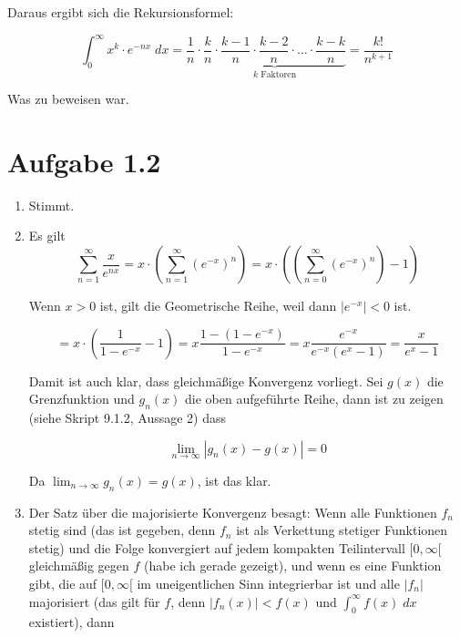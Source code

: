 \documentclass[a4paper,german,12pt,smallheadings]{scrartcl}
\begin{document}
Daraus ergibt sich die Rekursionsformel:

\begin{equation*}
  \int_0^\infty x^k \cdot e^{-nx} \; dx = \frac{1}{n} \cdot \underbrace{\frac{k}{n} \cdot \frac{k-1}{n} \cdot \frac{k-2}{n} \cdot \dots \cdot \frac{k-k}{n}}_{k\text{ Faktoren}} = \frac{k!}{n^{k+1}}
\end{equation*}

Was zu beweisen war.

\section*{Aufgabe 1.2}

\begin{enumerate}[(1)]
\item Stimmt.
\item Es gilt
  \begin{equation*}
    \sum_{n=1}^\infty \frac{x}{e^{nx}} = x \cdot \left(\sum_{n=1}^\infty \left(e^{-x}\right)^n\right) = x \cdot \left(\left(\sum_{n=0}^\infty \left(e^{-x}\right)^n\right) - 1\right)
  \end{equation*}

  Wenn $x>0$ ist, gilt die Geometrische Reihe, weil dann $|e^{-x}| < 0$ ist.

  \begin{equation*}
    = x \cdot \left( \frac{1}{1-e^{-x}} - 1 \right) = x \frac{1 - (1-e^{-x})}{1-e^{-x}} = x \frac{e^{-x}}{e^{-x} (e^x - 1)} = \frac{x}{e^x-1}
  \end{equation*}

  Damit ist auch klar, dass gleichmäßige Konvergenz vorliegt. Sei $g(x)$ die
  Grenzfunktion und $g_n(x)$ die oben aufgeführte Reihe, dann ist zu zeigen
  (siehe Skript 9.1.2, Aussage 2) dass

  \begin{equation*}
    \lim_{n \to \infty} |g_n(x) - g(x)| = 0
  \end{equation*}

  Da $\lim_{n \to \infty} g_n(x) = g(x)$, ist das klar.

\item
  Der Satz über die majorisierte Konvergenz besagt: Wenn alle Funktionen
  $f_n$ stetig sind (das ist gegeben, denn $f_n$ ist als Verkettung stetiger
  Funktionen stetig) und die Folge konvergiert auf jedem kompakten
  Teilintervall $[0,\infty[$ gleichmäßig gegen $f$ (habe ich gerade gezeigt),
  und wenn es eine Funktion gibt, die auf $[0,\infty[$ im
  uneigentlichen Sinn integrierbar ist und alle $|f_n|$ majorisiert
  (das gilt für $f$, denn $|f_n(x)| < f(x)$ und $\int_0^\infty f(x) \; dx$
  existiert), dann


\end{enumerate}
\end{document}
